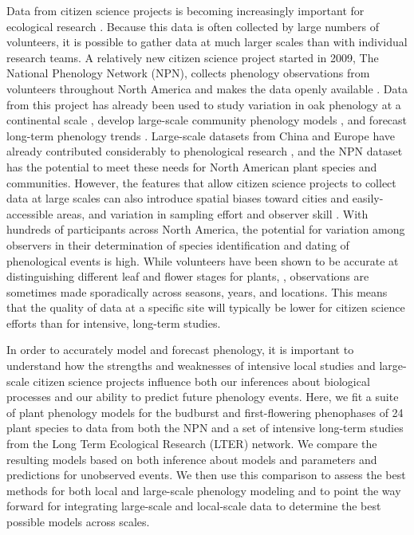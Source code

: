 \documentclass[fleqn,12pt,lineno]{wlpeerj} %
\begin{document}
Data from citizen science projects is becoming increasingly important for ecological research \citep{kelling2009, dickinson2010, tulloch2013}. Because this data is often collected by large numbers of volunteers, it is possible to gather data at much larger scales than with individual research teams. A relatively new citizen science project started in 2009, The National Phenology Network (NPN), collects phenology observations from volunteers throughout North America and makes the data openly available \citep{schwartz2012a}. Data from this project has already been used to study variation in oak phenology at a continental scale \citep{gerst2017}, develop large-scale community phenology models \citep{melaas2016}, and forecast long-term phenology trends \citep{jeong2013}. Large-scale datasets from China and Europe have already contributed considerably to phenological research \citep{xu2013, olsson2014, basler2016, zhang2017}, and the NPN dataset has the potential to meet these needs for North American plant species and communities. However, the features that allow citizen science projects to collect data at large scales can also introduce spatial biases toward cities and easily-accessible areas, and variation in sampling effort and observer skill \citep{dickinson2010}. With hundreds of participants across North America, the potential for variation among observers in their determination of species identification and dating of phenological events is high. While volunteers have been shown to be accurate at distinguishing different leaf and flower stages for plants, \citep{fuccillo2015}, observations are sometimes made sporadically across seasons, years, and locations. This means that the quality of data at a specific site will typically be lower for citizen science efforts than for intensive, long-term studies.

In order to accurately model and forecast phenology, it is important to understand how the strengths and weaknesses of intensive local studies and large-scale citizen science projects influence both our inferences about biological processes and our ability to predict future phenology events. Here, we fit a suite of plant phenology models for the budburst and first-flowering phenophases of 24 plant species to data from both the NPN and a set of intensive long-term studies from the Long Term Ecological Research (LTER) network. We compare the resulting models based on both inference about models and parameters and predictions for unobserved events. We then use this comparison to assess the best methods for both local and large-scale phenology modeling and to point the way forward for integrating large-scale and local-scale data to determine the best possible models across scales.
\end{document}
